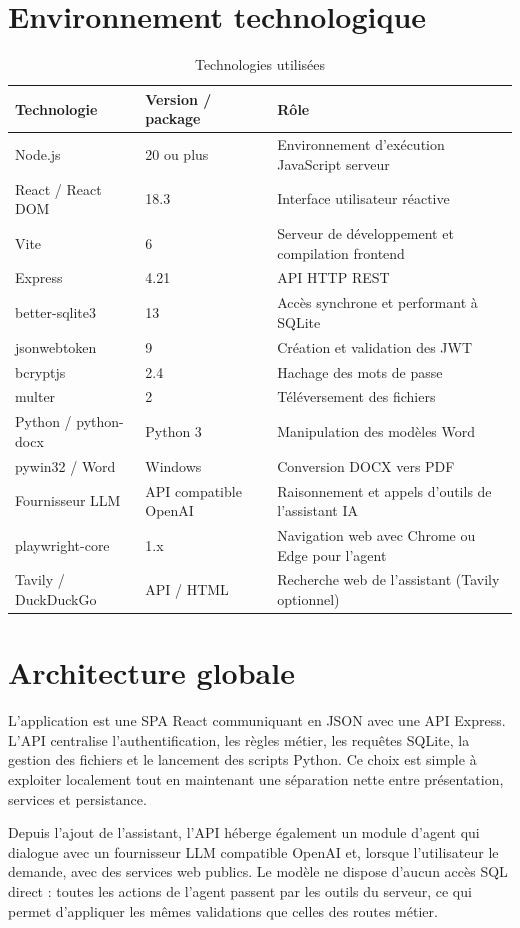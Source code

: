 \documentclass[12pt,a4paper,oneside]{report}
\begin{document}
\section{Environnement technologique}
\begin{table}[H]\centering
\caption{Technologies utilisées}
\begin{tabularx}{\textwidth}{p{3.5cm}p{3cm}Y}
\toprule \textbf{Technologie} & \textbf{Version / package} & \textbf{Rôle}\\ \midrule
Node.js & 20 ou plus & Environnement d'exécution JavaScript serveur\\
React / React DOM & 18.3 & Interface utilisateur réactive\\
Vite & 6 & Serveur de développement et compilation frontend\\
Express & 4.21 & API HTTP REST\\
better-sqlite3 & 13 & Accès synchrone et performant à SQLite\\
jsonwebtoken & 9 & Création et validation des JWT\\
bcryptjs & 2.4 & Hachage des mots de passe\\
multer & 2 & Téléversement des fichiers\\
Python / python-docx & Python 3 & Manipulation des modèles Word\\
pywin32 / Word & Windows & Conversion DOCX vers PDF\\
Fournisseur LLM & API compatible OpenAI & Raisonnement et appels d'outils de l'assistant IA\\
playwright-core & 1.x & Navigation web avec Chrome ou Edge pour l'agent\\
Tavily / DuckDuckGo & API / HTML & Recherche web de l'assistant (Tavily optionnel)\\
\bottomrule
\end{tabularx}
\end{table}

\section{Architecture globale}
L'application est une SPA React communiquant en JSON avec une API Express. L'API centralise l'authentification, les règles métier, les requêtes SQLite, la gestion des fichiers et le lancement des scripts Python. Ce choix est simple à exploiter localement tout en maintenant une séparation nette entre présentation, services et persistance.

Depuis l'ajout de l'assistant, l'API héberge également un module d'agent qui dialogue avec un fournisseur LLM compatible OpenAI et, lorsque l'utilisateur le demande, avec des services web publics. Le modèle ne dispose d'aucun accès SQL direct : toutes les actions de l'agent passent par les outils du serveur, ce qui permet d'appliquer les mêmes validations que celles des routes métier.
\end{document}
